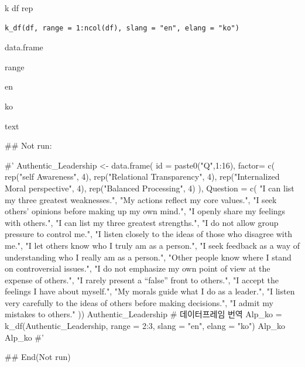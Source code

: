 \documentclass[a4paper]{book}
\begin{document}
%
\begin{Description}
k df rep
\end{Description}
%
\begin{Usage}
\begin{verbatim}
k_df(df, range = 1:ncol(df), slang = "en", elang = "ko")
\end{verbatim}
\end{Usage}
%
\begin{Arguments}
\begin{ldescription}
\item[\code{df}] data.frame

\item[\code{range}] range

\item[\code{slang}] en

\item[\code{elang}] ko
\end{ldescription}
\end{Arguments}
%
\begin{Value}
text
\end{Value}
%
\begin{Examples}
\begin{ExampleCode}

## Not run: 

#'
Authentic_Leadership <- data.frame(
  id = paste0("Q",1:16),
  factor= c(
    rep("self Awareness", 4),
    rep("Relational Transparency", 4),
    rep("Internalized Moral perspective", 4),
    rep("Balanced Processing", 4)
  ),
  Question = c(
    "I can list my three greatest weaknesses.",
    "My actions reflect my core values.",
    "I seek others' opinions before making up my own mind.",
    "I openly share my feelings with others.",
    "I can list my three greatest strengths.",
    "I do not allow group pressure to control me.",
    "I listen closely to the ideas of those who disagree with me.",
    "I let others know who I truly am as a person.",
    "I seek feedback as a way of understanding who I really am as a person.",
    "Other people know where I stand on controversial issues.",
    "I do not emphasize my own point of view at the expense of others.",
    "I rarely present a “false” front to others.",
    "I accept the feelings I have about myself.",
    "My morals guide what I do as a leader.",
    "I listen very carefully to the ideas of others before making decisions.",
    "I admit my mistakes to others."
  ))%
Authentic_Leadership
# 데이터프레임 번역
Alp_ko = k_df(Authentic_Leadership,
              range = 2:3,
              slang = "en",
              elang = "ko") %
Alp_ko
Alp_ko %
#'






## End(Not run)




\end{ExampleCode}
\end{Examples}
\end{document}
